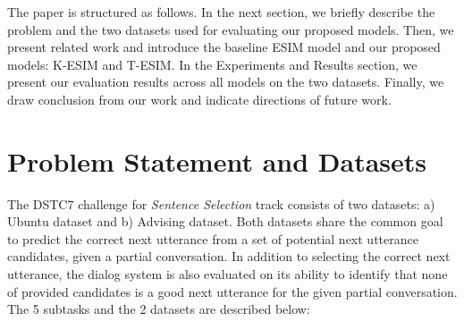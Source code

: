 \documentclass[letterpaper]{article} %
\begin{document}
The paper is structured as follows. In the next section, we briefly describe the problem and the two datasets used for evaluating our proposed models. Then, we present related work and introduce the baseline ESIM model and our proposed models: K-ESIM and T-ESIM. In the Experiments and Results section, we present our evaluation results across all models on the two datasets. Finally, we draw conclusion from our work and indicate directions of future work.

\section{Problem Statement and Datasets}
\label{Problem-Statement-and-datasets}
The DSTC7 challenge for \textit{Sentence Selection} track consists of two datasets: a) Ubuntu dataset and b) Advising dataset. Both datasets share the common goal to predict the correct next utterance from a set of potential next utterance candidates, given a partial conversation. In addition to selecting the correct next utterance, the dialog system is also evaluated on its ability to identify that none of provided candidates is a good next utterance for the given partial conversation. The 5 subtasks and the 2 datasets are described below:
\end{document}
